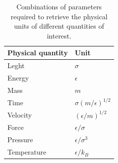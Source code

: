 \documentclass{article}
\begin{document}
  \begin{table}[htb]
    \centering
    \caption{Combinations of parameters required to retrieve the physical units of different quantities of interest.}\label{tab:units}
    \begin{tabular}{ll}\hline
      Physical quantity & Unit                         \\\hline\hline
      Leght             & \(\sigma\)                   \\
      Energy            & \(\epsilon\)                 \\
      Mass              & \(m\)                        \\
      Time              & \(\sigma(m/\epsilon)^{1/2}\) \\
      Velocity          & \((\epsilon/m)^{1/2}\)       \\
      Force             & \(\epsilon/\sigma\)          \\
      Pressure          & \(\epsilon/\sigma^{3}\)      \\
      Temperature       & \(\epsilon/k_{B}\)           \\\hline
    \end{tabular}
  \end{table}
\end{document}
